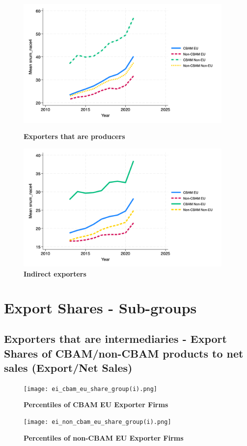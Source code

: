 \documentclass{article}
\begin{document}
\begin{figure}[H]
\centering
\includegraphics[width=0.95\textwidth]{snum_nace4_ep.png}
\caption{\textbf{Exporters that are producers}}
\includegraphics[width=0.95\textwidth]{snum_nace4_indir.png}
\caption{\textbf{Indirect exporters}}
\end{figure}

\section{Export Shares - Sub-groups}
\subsection{Exporters that are intermediaries - Export Shares of CBAM/non-CBAM products to net sales (Export/Net Sales)}
\begin{figure}[H]
\centering
\texttt{[image: ei\_cbam\_eu\_share\_group(i).png]}
\caption{\textbf{Percentiles of CBAM EU Exporter Firms}}
\texttt{[image: ei\_non\_cbam\_eu\_share\_group(i).png]}
\caption{\textbf{Percentiles of non-CBAM EU Exporter Firms}}
\end{figure}
\end{document}
